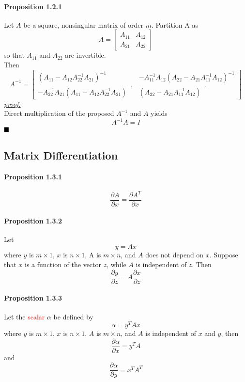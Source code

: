 \documentclass[11pt]{article}
\newcommand{\proof}[0]{\textit{\underline{proof:} }}
\newcommand{\qed}[0]{$\hfill\blacksquare$}
\begin{document}
\paragraph{Proposition 1.2.1}
Let $A$ be a square, nonsingular matrix of order $m$. Partition A as
$$ A = \begin{bmatrix}
	A_{11} & A_{12} \\
	A_{21} & A_{22}
\end{bmatrix}
$$
so that $A_{11}$ and $A_{22}$ are invertible. \\
Then
$$ A^{-1} = \begin{bmatrix}
	(A_{11} - A_{12}A_{22}^{-1}A_{21})^{-1} & -A_{11}^{-1}A_{12}(A_{22} - A_{21}A_{11}^{-1}A_{12})^{-1} \\
	-A_{22}^{-1}A_{21}(A_{11} - A_{12}A_{22}^{-1}A_{21})^{-1} & (A_{22} - A_{21}A_{11}^{-1}A_{12})^{-1}
\end{bmatrix}$$
\proof \\
Direct multiplication of the proposed $A^{-1}$ and $A$ yields
$$A^{-1}A = I$$ \qed

\subsection{Matrix Differentiation}
\paragraph{Proposition 1.3.1}
$$\frac{\partial A}{\partial x} = \frac{\partial A^T}{\partial x}$$
\paragraph{Proposition 1.3.2}
Let $$y = Ax$$
where $y$ is $m\times 1$, $x$ is $n \times 1$, A is $m \times n$, and $A$ does not depend on $x$. Suppose that $x$ is a function of the vector $z$, while $A$ is independent of $z$. Then
$$\frac{\partial y }{\partial z} = A \frac{\partial x}{\partial z}$$

\paragraph{Proposition 1.3.3}
Let the \textcolor{red}{scalar} $\alpha$ be defined by
$$\alpha = y^T Ax$$
where $y$ is $m \times 1$, $x$ is $n \times 1$, $A$ is $m \times n$, and $A$ is independent of $x$ and $y$, then
$$\frac{\partial \alpha}{\partial x} = y^TA$$
and 
$$\frac{\partial \alpha}{\partial y} = x^TA^T$$
\end{document}
